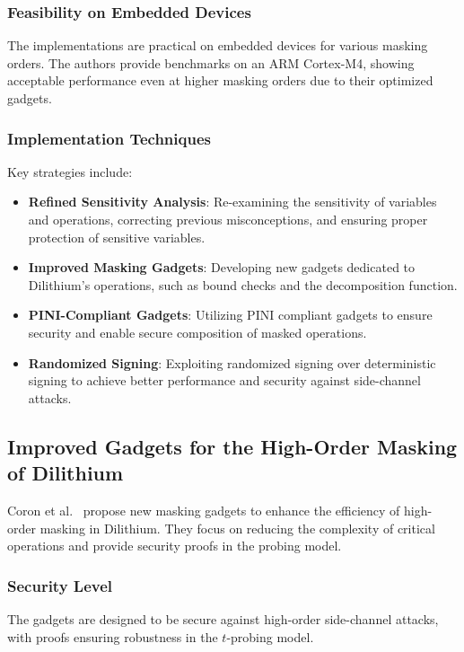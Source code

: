 \subsubsection{Feasibility on Embedded Devices}

The implementations are practical on embedded devices for various masking orders. The authors provide benchmarks on an ARM Cortex-M4, showing acceptable performance even at higher masking orders due to their optimized gadgets.

\subsubsection{Implementation Techniques}

Key strategies include:

\begin{itemize}
    \item \textbf{Refined Sensitivity Analysis}: Re-examining the sensitivity of variables and operations, correcting previous misconceptions, and ensuring proper protection of sensitive variables.
    \item \textbf{Improved Masking Gadgets}: Developing new gadgets dedicated to Dilithium's operations, such as bound checks and the decomposition function.
    \item \textbf{PINI-Compliant Gadgets}: Utilizing \ac{PINI} compliant gadgets to ensure security and enable secure composition of masked operations.
    \item \textbf{Randomized Signing}: Exploiting randomized signing over deterministic signing to achieve better performance and security against side-channel attacks.
\end{itemize}

\subsection{Improved Gadgets for the High-Order Masking of Dilithium}

Coron et al.\ \cite{Coron23} propose new masking gadgets to enhance the efficiency of high-order masking in Dilithium. They focus on reducing the complexity of critical operations and provide security proofs in the probing model.

\subsubsection{Security Level}

The gadgets are designed to be secure against high-order side-channel attacks, with proofs ensuring robustness in the $t$-probing model.

